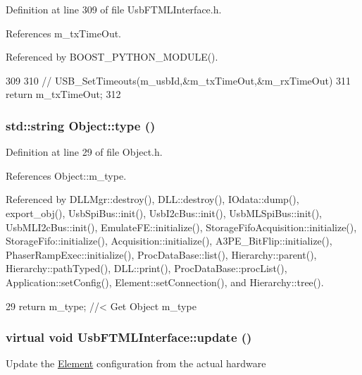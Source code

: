 Definition at line 309 of file UsbFTMLInterface.h.

References m\_\-txTimeOut.

Referenced by BOOST\_\-PYTHON\_\-MODULE().


\begin{DoxyCode}
309                    {
310     //    USB_SetTimeouts(m_usbId,&m_txTimeOut,&m_rxTimeOut)
311     return m_txTimeOut;
312   }  
\end{DoxyCode}
\hypertarget{classObject_a84f99f70f144a83e1582d1d0f84e4e62}{
\subsubsection[{type}]{\setlength{\rightskip}{0pt plus 5cm}std::string Object::type ()}}
\label{classObject_a84f99f70f144a83e1582d1d0f84e4e62}


Definition at line 29 of file Object.h.

References Object::m\_\-type.

Referenced by DLLMgr::destroy(), DLL::destroy(), IOdata::dump(), export\_\-obj(), UsbSpiBus::init(), UsbI2cBus::init(), UsbMLSpiBus::init(), UsbMLI2cBus::init(), EmulateFE::initialize(), StorageFifoAcquisition::initialize(), StorageFifo::initialize(), Acquisition::initialize(), A3PE\_\-BitFlip::initialize(), PhaserRampExec::initialize(), ProcDataBase::list(), Hierarchy::parent(), Hierarchy::pathTyped(), DLL::print(), ProcDataBase::procList(), Application::setConfig(), Element::setConnection(), and Hierarchy::tree().


\begin{DoxyCode}
29 { return m_type;       } //< Get Object m_type
\end{DoxyCode}
\hypertarget{classUsbFTMLInterface_a941ba5a5c0f398e5d26c97bb4111510d}{
\subsubsection[{update}]{\setlength{\rightskip}{0pt plus 5cm}virtual void UsbFTMLInterface::update ()}}
\label{classUsbFTMLInterface_a941ba5a5c0f398e5d26c97bb4111510d}
Update the \hyperlink{classElement}{Element} configuration from the actual hardware 

